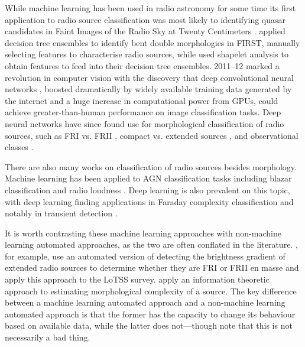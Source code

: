         While machine learning has been used in radio astronomy for some time \citep[e.g. the NVSS used neural networks to detect sidelobes;]{condon98nvss} its first application to radio source classification was most likely to identifying quasar candidates \citep{carballo_selection_2004} in Faint Images of the Radio Sky at Twenty Centimeters \citep[FIRST;][]{becker95first}. \citet{proctor06} applied decision tree ensembles to identify bent double morphologies in FIRST, manually selecting features to characterise radio sources, while \citet{bastien_classifying_2017} used shapelet analysis to obtain features to feed into their decision tree ensembles. 2011--12 marked a revolution in computer vision with the discovery that deep convolutional neural networks \citep[known as early as 1989, see][]{lecun_backpropagation_1989}, boosted dramatically by widely available training data generated by the internet and a huge increase in computational power from GPUs, could achieve greater-than-human performance on image classification tasks. Deep neural networks have since found use for morphological classification of radio sources, such as FRI vs. FRII \parencites{aniyan17cnn,ma_machine_2019,lukic_morphological_2019,tang_transfer_2019,samudre_data-efficient_2020,bowles_attention-gating_2020}[see also][]{ma_radio_2018}, compact vs. extended sources \citep{lukic18compact,alhassan_first_2018,lukic_morphological_2019}, and observational classes \citep{galvin19som,ralph19ae}.

        There are also many works on classification of radio sources besides morphology. Machine learning has been applied to AGN classification tasks including blazar classification \citep{arsioli_machine_2020} and radio loudness \citep{beaklini_agn_2020}. Deep learning is also prevalent on this topic, with deep learning finding applications in Faraday complexity classification \citep{brown_classifying_2018} and notably in transient detection \citep{connor_applying_2018,guo_pulsar_2019,wang_pulsar_2019,agarwal_fetch_2020,lin_pulsar_2020,zhang_applying_2020,balakrishnan_pulsar_2020}.

        It is worth contrasting these machine learning approaches with non-machine learning automated approaches, as the two are often conflated in the literature. \citet{mingo_revisiting_2019}, for example, use an automated version of detecting the brightness gradient of extended radio sources to determine whether they are FRI or FRII en masse and apply this approach to the LoTSS survey. \citet{segal_identifying_2019} apply an information theoretic approach to estimating morphological complexity of a source. The key difference between a machine learning automated approach and a non-machine learning automated approach is that the former has the capacity to change its behaviour based on available data, while the latter does not---though note that this is not necessarily a bad thing.

